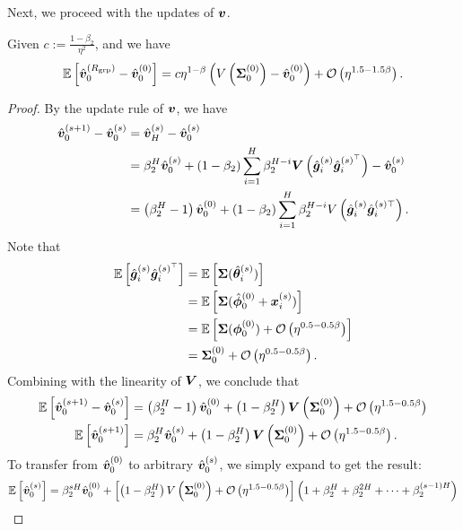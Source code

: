 Next, we proceed with the updates of ${\bm{v}}$.
\begin{lemma}\label{lmm:1st-moment-v}
    Given $c :=\frac{1-\beta_2}{\eta^2}$, and we have 
    \begin{align*}
        \mathbb{E}\left[\hat{{\bm{v}}}_0^{(R_{\mathrm{grp}})} -\hat{{\bm{v}}}_0^{(0)}\right] = c \eta^{1-\beta} \left(V\left({\bm{\Sigma}}_0^{(0)}\right) - \hat{{\bm{v}}}_0^{(0)}\right) + \mathcal{O}\left(\eta^{1.5-1.5\beta}\right).
    \end{align*}
\end{lemma}
\begin{proof}
    By the update rule of ${\bm{v}}$, we have
    \begin{align*}
        \hat{{\bm{v}}}_0^{(s+1)} - \hat{{\bm{v}}}_0^{(s)} &= \hat{{\bm{v}}}_H^{(s)} - \hat{{\bm{v}}}_0^{(s)} \\
        &= \beta_2^H \hat{{\bm{v}}}_0^{(s)} + (1-\beta_2) \sum_{i=1}^{H} \beta_2^{H-i} {\bm{V}}\left(\hat{{\bm{g}}}_i^{(s)} {\hat{{\bm{g}}}_i^{(s)^\top}}\right) - \hat{{\bm{v}}}_0^{(s)} \\
        &= \left(\beta_2^H - 1\right) \hat{{\bm{v}}}_0^{(0)} + (1 - \beta_2)\sum_{i=1}^{H}\beta_2^{H-i} V\left(\hat{{\bm{g}}}_i^{(s)} {\hat{{\bm{g}}}_i^{(s)\top}}\right).
    \end{align*}
    Note that \begin{align*}
        \mathbb{E}\left[\hat{{\bm{g}}}_i^{(s)} {\hat{{\bm{g}}}_i^{(s)^\top}}\right] &= \mathbb{E}\left[{\bm{\Sigma}}(\hat{{\bm{\theta}}}_i^{(s)})\right] \\
        &= \mathbb{E}\left[{\bm{\Sigma}}(\hat{{\bm{\phi}}}_0^{(0)} + {\bm{x}}_i^{(s)})\right] \\
        &= \mathbb{E}\left[{\bm{\Sigma}}({\bm{\phi}}_0^{(0)}) + \mathcal{O}\left(\eta^{0.5-0.5\beta}\right)\right] \\
        &= {\bm{\Sigma}}_0^{(0)} + \mathcal{O}\left(\eta^{0.5-0.5\beta}\right).
    \end{align*}
    Combining with the linearity of ${\bm{V}}$, we conclude that \begin{align*}
        \mathbb{E}\left[\hat{{\bm{v}}}_0^{(s+1)} - \hat{{\bm{v}}}_0^{(s)}\right] &= \left(\beta_2^H - 1\right) \hat{{\bm{v}}}_0^{(0)} + \left(1 - \beta_2^H \right) {\bm{V}}\left({\bm{\Sigma}}_0^{(0)}\right) + \mathcal{O}\left(\eta^{1.5-0.5\beta}\right) \\
        \mathbb{E}\left[\hat{{\bm{v}}}_0^{(s+1)}\right] &= \beta_2^H \hat{{\bm{v}}}_0^{(s)} + \left(1 - \beta_2^H \right) {\bm{V}}\left({\bm{\Sigma}}_0^{(0)}\right) + \mathcal{O}\left(\eta^{1.5-0.5\beta}\right).
    \end{align*}
    To transfer from $\hat{{\bm{v}}}_0^{(0)}$ to arbitrary $\hat{{\bm{v}}}_0^{(s)}$, we simply expand to get the result: \begin{align*}
        \E\left[\hat{\vv}_0^{(s)}\right] &= \beta_2^{sH} \hat{\vv}_0^{(0)} + \left[\left(1 - \beta_2^H\right) V\left(\mSigma_0^{(0)}\right) + \O\left(\eta^{1.5-0.5\beta}\right)\right]\left(1 + \beta_2^H + \beta_2^{2H} + \dots + \beta_2^{(s-1)H}\right) \\

\end{align*}
\end{proof}
